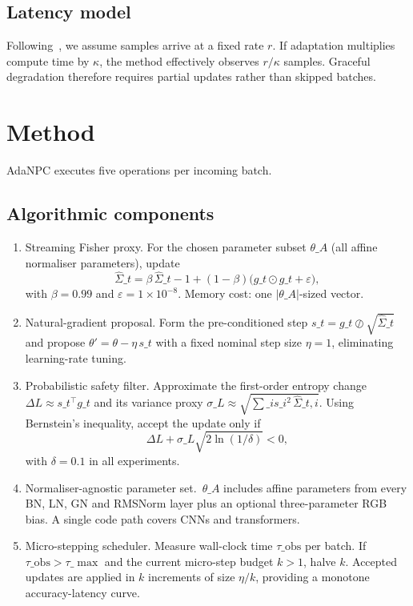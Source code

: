 \documentclass{article} %
\begin{document}
\subsection{Latency model}
Following~\cite{alfarra-2023-evaluation}, we assume samples arrive at a fixed rate \(r\). If adaptation multiplies compute time by \(\kappa\), the method effectively observes \(r/\kappa\) samples. Graceful degradation therefore requires partial updates rather than skipped batches.

\section{Method}\label{sec:method}
AdaNPC executes five operations per incoming batch.
\subsection{Algorithmic components}
\begin{enumerate}
  \item Streaming Fisher proxy. For the chosen parameter subset \(\theta\_A\) (all affine normaliser parameters), update
  \[
    \hat{\Sigma}\_t = \beta \, \hat{\Sigma}\_{t-1} + (1-\beta)\big( g\_t \odot g\_t + \varepsilon \big),
  \]
  with \(\beta = 0.99\) and \(\varepsilon = 1\times 10^{-8}\). Memory cost: one \(\lvert\theta\_A\rvert\)-sized vector.
  \item Natural-gradient proposal. Form the pre-conditioned step \(s\_t = g\_t \oslash \sqrt{\hat{\Sigma}\_t}\) and propose \(\theta' = \theta - \eta \, s\_t\) with a fixed nominal step size \(\eta = 1\), eliminating learning-rate tuning.
  \item Probabilistic safety filter. Approximate the first-order entropy change \(\Delta L \approx s\_t^{\top} g\_t\) and its variance proxy \(\sigma\_L \approx \sqrt{\sum\_i s\_i^2 \, \hat{\Sigma}\_{t,i}}\). Using Bernstein's inequality, accept the update only if
  \[
    \Delta L + \sigma\_L \sqrt{2\ln(1/\delta)} < 0,
  \]
  with \(\delta = 0.1\) in all experiments.
  \item Normaliser-agnostic parameter set.\ \(\theta\_A\) includes affine parameters from every BN, LN, GN and RMSNorm layer plus an optional three-parameter RGB bias. A single code path covers CNNs and transformers.
  \item Micro-stepping scheduler. Measure wall-clock time \(\tau\_{\mathrm{obs}}\) per batch. If \(\tau\_{\mathrm{obs}} > \tau\_{\max}\) and the current micro-step budget \(k>1\), halve \(k\). Accepted updates are applied in \(k\) increments of size \(\eta/k\), providing a monotone accuracy-latency curve.
\end{enumerate}
\end{document}
